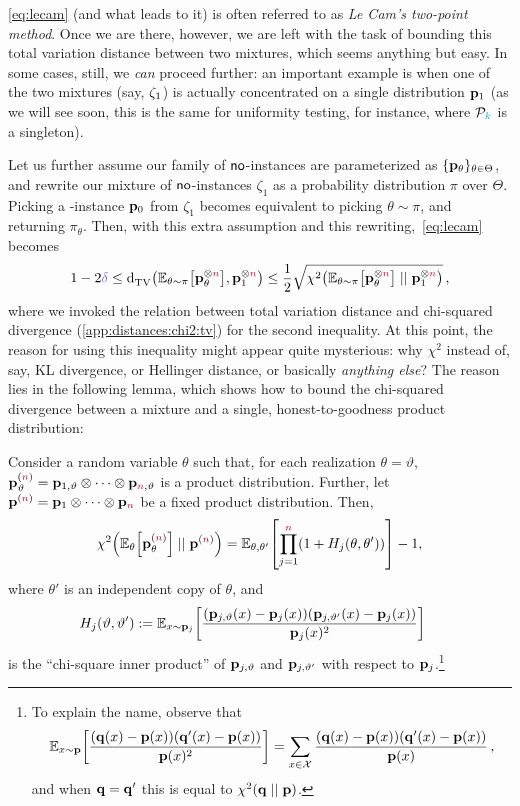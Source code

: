\cref{eq:lecam} (and what leads to it) is often referred to as \emph{Le Cam's two-point method}. Once we are there, however, we are left with the task of bounding this total variation distance between two mixtures, which seems anything but easy. In some cases, still, we \emph{can} proceed further: an important example is when one of the two mixtures (say, $\zeta_1$) is actually concentrated on a single distribution $\mathbf{p}_1$ (as we will see soon, this is the same for uniformity testing, for instance, where $\mathcal{P}_{\textcolor{cyan}{k}}$ is a singleton). 

Let us further assume our family of ${\sf{}no}$-instances are parameterized as $\{\mathbf{p}_\theta\}_{\theta\in\Theta}$, and rewrite our mixture of ${\sf{}no}$-instances $\zeta_1$ as a probability distribution $\pi$ over $\Theta$. Picking a \no-instance $\mathbf{p}_0$ from $\zeta_1$ becomes equivalent to picking $\theta\sim\pi$, and returning $\pi_\theta$. Then, with this extra assumption and this rewriting,~\cref{eq:lecam} becomes
\begin{equation}
	\label{eq:lecam:simpler}
	1-2\errprob \leq \totalvardist{\bE{\theta\sim\pi}{\p_\theta^{\otimes\ns}}}{\p_\accept^{\otimes\ns}}
	\leq \frac{1}{2}\sqrt{\chisquare{\bE{\theta\sim\pi}{\p_\theta^{\otimes\ns}}}{\p_\accept^{\otimes\ns}}}\,,
\end{equation}
where we invoked the relation between total variation distance and chi-squared divergence (\cref{app:distances:chi2:tv}) for the second inequality. At this point, the reason for using this inequality might appear quite mysterious: why $\chi^2$ instead of, say, KL divergence, or Hellinger distance, or basically \emph{anything else}? The reason lies in the following lemma, which shows how to bound the chi-squared divergence between a mixture and a single, honest-to-goodness product distribution:
\begin{lemma}
	\label{lem:ingster}
Consider a random variable $\theta$ such that, for each realization
$\theta=\vartheta$, $\mathbf{p}_\vartheta^{({\textcolor{purple}{n}})}=\mathbf{p}_{1,\vartheta} \otimes \dots \otimes \mathbf{p}_{{\textcolor{purple}{n}},\vartheta}$ is a product distribution. Further, let
$\mathbf{p}^{({\textcolor{purple}{n}})} = \mathbf{p}_1 \otimes \dots \otimes \mathbf{p}_{\textcolor{purple}{n}}$ be a fixed product
distribution. Then,
\[
\chisquare{\bE{\theta}{\p_\theta^{(\ns)}} }{ \p^{(\ns)} } = \bE{\theta,\theta'}{\prod_{j=1}^\ns (1+{H_j(\theta,\theta')})} - 1,
\]
where $\theta'$ is an independent copy of $\theta$, and
\begin{align*}
H_{j}(\vartheta,\vartheta') &\eqdef \bE{x\sim\p_j}{\frac{(\p_{j,\vartheta}(x)-\p_j(x))(\p_{j,\vartheta'}(x)-\p_j(x))}{\p_j(x)^2}}%
\end{align*}
is the ``chi-square inner product'' of $\mathbf{p}_{j,\vartheta}$ and $\mathbf{p}_{j,\vartheta'}$ with respect to $\mathbf{p}_j$.\footnote{To explain the name, observe that
\[
\bE{x\sim\p}{\frac{(\q(x)-\p(x))(\q'(x)-\p(x))}{\p(x)^2}}=\sum_{x\in\domain} \frac{(\q(x)-\p(x))(\q'(x)-\p(x))}{\p(x)}\,,
\] and when $\mathbf{q}=\mathbf{q}'$ this is equal to $\chisquare{\q}{\p}$.}
\end{lemma}
